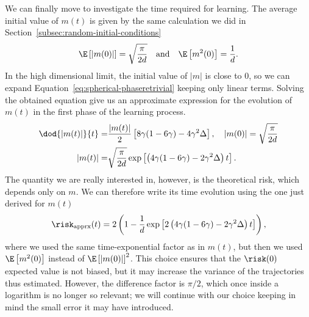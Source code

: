 We can finally move to investigate the time required for learning. The average initial value of \(m{(t)}\) is given by
the same calculation we did in Section~\ref{subsec:random-initial-conditions}
\[
  \E\left[|m(0)|\right] = \sqrt{\frac{\pi}{2d}}\quad\text{and}\quad
  \E\left[m^2(0)\right] = \frac1d.
\]
In the high dimensional limit, the initial value of \(|m|\) is close to 0, so we can expand Equation~\eqref{eq:spherical-phaseretrivial} keeping only linear terms.
Solving the obtained equation give us an approximate expression for the evolution of \(m(t)\) in the first phase of the learning process.
\[\begin{split}
  \dod{|m{(t)}|}{t} =& \frac{|m{(t)}|}{2}\left[8\gamma(1-6\gamma)-4\gamma^2\Delta\right], \quad |m{(0)}| = \sqrt{\frac{\pi}{2d}} \\
  |m{(t)}| =& \sqrt{\frac{\pi}{2d}} \exp\left[\left(4\gamma(1-6\gamma)-2\gamma^2\Delta\right)t\right].
\end{split}\]
The quantity we are really interested in, however, is the theoretical risk, which depends only on \(m\).
We can therefore write its time evolution using the one just derived for \(m(t)\)
\[
  \risk_\text{apprx}{(t)} = 2\left(1-\frac1d \exp\left[2\left(4\gamma(1-6\gamma)-2\gamma^2\Delta\right)t\right]\right),
\]
where we used the same time-exponential factor as in \(m{(t)}\), but then we used \(\E\left[m^2(0)\right]\)
instead of \(\E\left[|m(0)|\right]^2\).
This choice ensures that the \(\risk(0)\) expected value is not biased,
but it may increase the variance of the trajectories thus estimated.
However, the difference factor is \(\pi/2\), which once inside a logarithm is no longer so relevant;
we will continue with our choice keeping in mind the small error it may have introduced.

